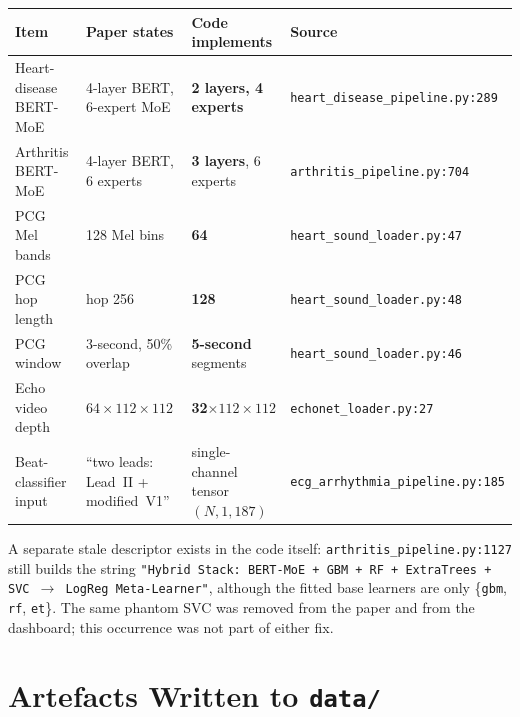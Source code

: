 \documentclass[11pt,a4paper]{article}
\newcommand{\code}[1]{\texttt{\small #1}}
\begin{document}
\begin{table}[!ht]
\centering
\footnotesize
\begin{tabular}{@{}p{2.8cm}p{3.7cm}p{3.3cm}p{4.8cm}@{}}
\toprule
\textbf{Item} & \textbf{Paper states} & \textbf{Code implements} &
\textbf{Source}\\
\midrule
Heart-disease BERT-MoE & 4-layer BERT, 6-expert MoE &
\textbf{2 layers, 4 experts} &
\code{heart\_disease\_}\newline\code{pipeline.py:289}\\
\addlinespace
Arthritis BERT-MoE & 4-layer BERT, 6 experts &
\textbf{3 layers}, 6 experts &
\code{arthritis\_pipeline.py:704}\\
\addlinespace
PCG Mel bands & 128 Mel bins & \textbf{64} &
\code{heart\_sound\_loader.py:47}\\
\addlinespace
PCG hop length & hop 256 & \textbf{128} &
\code{heart\_sound\_loader.py:48}\\
\addlinespace
PCG window & 3-second, 50\% overlap &
\textbf{5-second} segments &
\code{heart\_sound\_loader.py:46}\\
\addlinespace
Echo video depth & $64\times112\times112$ &
\textbf{32}$\times112\times112$ &
\code{echonet\_loader.py:27}\\
\addlinespace
Beat-classifier input & ``two leads: Lead~II + modified~V1'' &
single-channel tensor $(N,1,187)$ &
\code{ecg\_arrhythmia\_}\newline\code{pipeline.py:185}\\
\bottomrule
\end{tabular}
\end{table}

\noindent
A separate stale descriptor exists in the code itself:
\code{arthritis\_pipeline.py:1127} still builds the string
\code{"Hybrid Stack: BERT-MoE + GBM + RF + ExtraTrees + SVC $\rightarrow$
LogReg Meta-Learner"}, although the fitted base learners are only
\{\code{gbm}, \code{rf}, \code{et}\}. The same phantom SVC was removed from
the paper and from the dashboard; this occurrence was not part of either
fix.

\section{Artefacts Written to \texorpdfstring{\code{data/}}{data/}}
\end{document}
